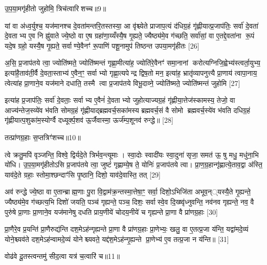 {\scriptsize {उ॒प॒या॒मगृ॑हीतो जुहोमि॒ त्रिच॑त्वारिशच्च॥9॥}}

यां वा अ॑ध्व॒र्युश्च॒ यज॑मानश्च दे॒वता॑मन्तरि॒तस्तस्या॒ आ वृ॑श्च्येते प्राजाप॒त्यं द॑धिग्र॒हं गृ॑ह्णीयात्प्र॒जाप॑तिः॒ सर्वा॑ दे॒वता॑ दे॒वताभ्य ए॒व नि ह्नु॑वाते ज्ये॒ष्ठो वा ए॒ष ग्रहा॑णा॒य्यँस्यै॒ष गृ॒ह्यते॒ ज्यैष्ठ्य॑मे॒व ग॑च्छति॒ सर्वा॑सां॒ वा ए॒तद्दे॒वता॑ना रू॒पं यदे॒ष ग्रहो॒ यस्यै॒ष गृ॒ह्यते॒ सर्वाण्ये॒वैनꣳ॑ रू॒पाणि॑ पशू॒नामुप॑ तिष्ठन्त उपया॒मगृ॑हीतः [26]

अ॒सि॒ प्र॒जाप॑तये त्वा॒ ज्योति॑ष्मते॒ ज्योति॑ष्मन्तं गृह्णा॒मीत्या॑ह॒ ज्योति॑रे॒वैनꣳ॑ समा॒नानां करोत्यग्निजि॒ह्वेभ्य॑स्त्वर्ता॒युभ्य॒ इत्या॑है॒ताव॑ती॒र्वै दे॒वता॒स्ताभ्य॑ ए॒वैन॒ꣳ॒ सर्वाभ्यो गृह्णा॒त्यपेन्द्र द्विष॒तो मन॒ इत्या॑ह॒ भ्रातृ॑व्यापनुत्त्यै प्रा॒णाय॑ त्वापा॒नाय॒ त्वेत्या॑ह प्रा॒णाने॒व यज॑माने दधाति॒ तस्मै त्वा प्र॒जाप॑तये विभू॒दाव्ने॒ ज्योति॑ष्मते॒ ज्योति॑ष्मन्तं जुहोमि [27]

इत्या॑ह प्र॒जाप॑तिः॒ सर्वा॑ दे॒वताः॒ सर्वाभ्य ए॒वैनं॑ दे॒वताभ्यो जुहोत्याज्यग्र॒हं गृ॑ह्णीया॒त्तेज॑स्कामस्य॒ तेजो॒ वा आज्य॑न्तेज॒स्व्ये॑व भ॑वति सोमग्र॒हं गृ॑ह्णीयाद्ब्रह्मवर्च॒सका॑मस्य ब्रह्मवर्च॒सं वै सोमो ब्रह्मवर्च॒स्ये॑व भ॑वति दधिग्र॒हं गृ॑ह्णीयात्प॒शुका॑म॒स्योर्ग्वै दध्यूर्क्प॒शव॑ ऊ॒र्जैवास्मा॒ ऊर्ज॑म्प॒शूनव॑ रुन्द्धे॥ [28]

{\scriptsize {तत्प्रा॑णग्र॒हाः स॒प्तत्रिꣳ॑शच्च॥10॥}}

त्वे क्रतु॒मपि॑ वृञ्जन्ति॒ विश्वे॒ द्विर्यदे॒ते त्रिर्भव॒न्त्यूमाः। स्वा॒दोः स्वादी॑यः स्वा॒दुना॑ सृजा॒ समत॑ ऊ॒ षु मधु॒ मधु॑ना॒भि यो॑धि। उ॒प॒या॒मगृ॑हीतोऽसि प्र॒जाप॑तये त्वा॒ जुष्टं॑ गृह्णाम्ये॒ष ते॒ योनिः॑ प्र॒जाप॑तये त्वा। प्रा॒ण॒ग्र॒हान्गृ॑ह्णात्ये॒ताव॒द्वा अ॑स्ति॒ याव॑दे॒ते ग्रहाः॒ स्तोमा॒श्छन्दाꣳ॑सि पृ॒ष्ठानि॒ दिशो॒ याव॑दे॒वास्ति॒ तत् [29]

अव॑ रुन्द्धे ज्ये॒ष्ठा वा ए॒तान्ब्राह्म॒णाः पु॒रा वि॒द्वाम॑क्र॒न्तस्मा॒त्तेषा॒ꣳ॒ सर्वा॒ दिशो॒ऽभिजि॑ता अभूव॒न््यस्यै॒ते गृ॒ह्यन्ते॒ ज्यैष्ठ्य॑मे॒व ग॑च्छत्य॒भि दिशो॑ जयति॒ पञ्च॑ गृह्यन्ते॒ पञ्च॒ दिशः॒ सर्वास्वे॒व दि॒ख्ष्वृ॑ध्नुवन्ति॒ नव॑नव गृह्यन्ते॒ नव॒ वै पुरु॑षे प्रा॒णाः प्रा॒णाने॒व यज॑मानेषु दधति प्राय॒णीये॑ चोदय॒नीये॑ च गृह्यन्ते प्रा॒णा वै प्रा॑णग्र॒हाः [30]

प्रा॒णैरे॒व प्र॒यन्ति॑ प्रा॒णैरुद्य॑न्ति दश॒मेऽह॑न्गृह्यन्ते प्रा॒णा वै प्रा॑णग्र॒हाः प्रा॒णेभ्यः॒ खलु॒ वा ए॒तत्प्र॒जा य॑न्ति॒ यद्वा॑मदे॒व्यं योने॒श्च्यव॑ते दश॒मेऽह॑न्वामदे॒व्यं योनेश्च्यवते॒ यद्द॑श॒मेऽह॑न्गृ॒ह्यन्ते प्रा॒णेभ्य॑ ए॒व तत्प्र॒जा न य॑न्ति॥ [31]

{\scriptsize {वोढ॑वे दू॒तस्त्वन्तमु॑ सीद॒त्वा यत्र॑ च॒त्वारि॑ च॥11॥}}

